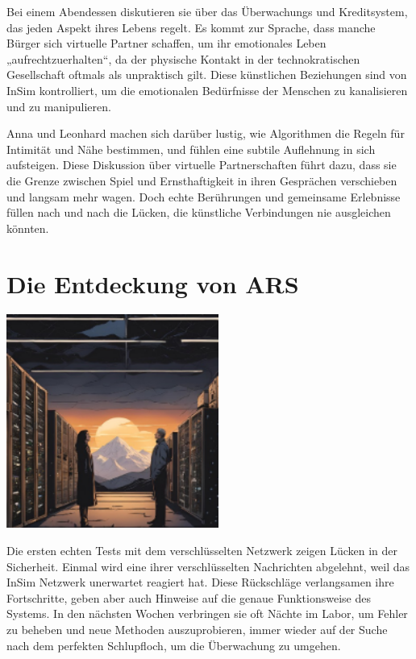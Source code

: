 \documentclass[
]{article}
\begin{document}
Bei einem Abendessen diskutieren sie über das Überwachungs und
Kreditsystem, das jeden Aspekt ihres Lebens regelt. Es kommt zur
Sprache, dass manche Bürger sich virtuelle Partner schaffen, um ihr
emotionales Leben „aufrechtzuerhalten``, da der physische Kontakt in der
technokratischen Gesellschaft oftmals als unpraktisch gilt. Diese
künstlichen Beziehungen sind von InSim kontrolliert, um die emotionalen
Bedürfnisse der Menschen zu kanalisieren und zu manipulieren.

Anna und Leonhard machen sich darüber lustig, wie Algorithmen die Regeln
für Intimität und Nähe bestimmen, und fühlen eine subtile Auflehnung in
sich aufsteigen. Diese Diskussion über virtuelle Partnerschaften führt
dazu, dass sie die Grenze zwischen Spiel und Ernsthaftigkeit in ihren
Gesprächen verschieben und langsam mehr wagen. Doch echte Berührungen
und gemeinsame Erlebnisse füllen nach und nach die Lücken, die
künstliche Verbindungen nie ausgleichen könnten.

\section{Die Entdeckung von ARS}\label{die-entdeckung-von-ars}

\includegraphics[width=2.73958in,height=2.76042in]{media/image0004.png}

Die ersten echten Tests mit dem verschlüsselten Netzwerk zeigen Lücken
in der Sicherheit. Einmal wird eine ihrer verschlüsselten Nachrichten
abgelehnt, weil das InSim Netzwerk unerwartet reagiert hat. Diese
Rückschläge verlangsamen ihre Fortschritte, geben aber auch Hinweise auf
die genaue Funktionsweise des Systems. In den nächsten Wochen verbringen
sie oft Nächte im Labor, um Fehler zu beheben und neue Methoden
auszuprobieren, immer wieder auf der Suche nach dem perfekten
Schlupfloch, um die Überwachung zu umgehen.
\end{document}
